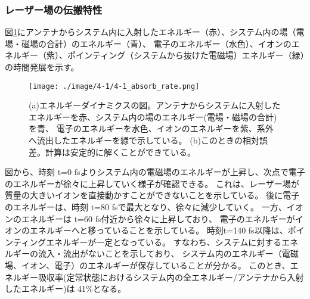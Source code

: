 \documentclass[a4paper,11pt,titlepage]{jsarticle}
\begin{document}
    \subsubsection{レーザー場の伝搬特性} 
    図\ref{fig:4-1_absorb_rate}にアンテナからシステム内に入射したエネルギー（赤）、システム内の場（電場・磁場の合計）のエネルギー（青）、
    電子のエネルギー（水色）、イオンのエネルギー（紫）、ポインティング（システムから抜けた電磁場）エネルギー（緑）の時間発展を示す。
    \begin{figure}[H]
        \begin{center}
          \texttt{[image: ./image/4-1/4-1\_absorb\_rate.png]}
          \caption{
            \label{fig:4-1_absorb_rate}
              (a)エネルギーダイナミクスの図。アンテナからシステムに入射したエネルギーを赤、システム内の場のエネルギー(電場・磁場の合計)を青、
              電子のエネルギーを水色、イオンのエネルギーを紫、系外へ流出したエネルギーを緑で示している。
              (b)このときの相対誤差。計算は安定的に解くことができている。
          }
        \end{center}
      \end{figure}
    図から、時刻 t=0 fsよりシステム内の電磁場のエネルギーが上昇し、次点で電子のエネルギーが徐々に上昇していく様子が確認できる。
    これは、レーザー場が質量の大きいイオンを直接動かすことができないことを示している。
    後に電子のエネルギーは、時刻 t=80 fsで最大となり、徐々に減少していく。
    一方、イオンのエネルギーは t=60 fs付近から徐々に上昇しており、
    電子のエネルギーがイオンのエネルギーへと移っていることを示している。
    時刻t=140 fs以降は、ポインティングエネルギーが一定となっている。
    すなわち、システムに対するエネルギーの流入・流出がないことを示しており、
    システム内のエネルギー（電磁場、イオン、電子）のエネルギーが保存していることが分かる。
    このとき、エネルギー吸収率(定常状態におけるシステム内の全エネルギー/アンテナから入射したエネルギー)は 41\%となる。
\end{document}
